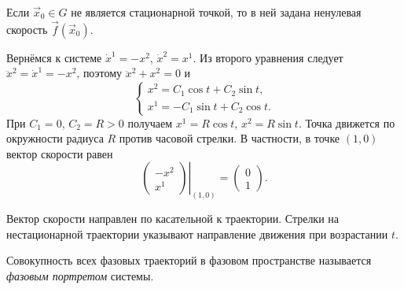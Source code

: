 \documentclass[12pt,a4paper]{article}
\numberwithin{equation}{section}
\newcommand{\vect}[1]{\vec{#1}}
\begin{document}
Если $\vect{x}_0\in G$ не является стационарной точкой, то в ней
задана ненулевая скорость $\vect f(\vect{x}_0)$.

\begin{exampleHSE}
Вернёмся к системе $\dot{x}^1=-x^2$, $\dot{x}^2=x^1$.
Из второго уравнения следует $\ddot{x}^2=\dot{x}^1=-x^2$, поэтому
$\ddot{x}^2+x^2=0$ и
\[
 \begin{cases}
 x^2=C_1\cos t+C_2\sin t,\\
 x^1=-C_1\sin t+C_2\cos t.
 \end{cases}
\]
При $C_1=0$, $C_2=R>0$ получаем $x^1=R\cos t$, $x^2=R\sin t$.
Точка движется по окружности радиуса $R$ против часовой стрелки.
В частности, в точке $(1,0)$ вектор скорости равен
\[
 \left.\begin{pmatrix}-x^2\\x^1\end{pmatrix}\right|_{(1,0)}
 =\begin{pmatrix}0\\1\end{pmatrix}.
\]
\begin{center}
\end{center}
\end{exampleHSE}

Вектор скорости направлен по касательной к траектории. Стрелки на
нестационарной траектории указывают направление движения при возрастании $t$.

\begin{definitionHSE}
Совокупность всех фазовых траекторий в фазовом пространстве называется
\textit{фазовым портретом} системы.
\end{definitionHSE}
\end{document}
